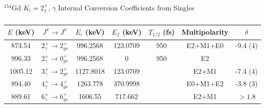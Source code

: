 \begin{table}
    \centering
    \caption{$^{154}$Gd $K_i=2^+_1$, $\gamma$ Internal Conversion Coefficients from Singles}
    \label{tab:154Gd_Single_gamma_Disc}
\begin{ThreePartTable}
    \begin{subtable}{\textwidth}
        \caption{}
    \begin{tabular}{c|c|c|c|c|c|c}
        \toprule
        $E$ (keV)	&	$J^{\pi}	\rightarrow	J^{\pi}$	&	$E_i$ (keV)	&	$E_f$ (keV)	&	$T_{1/2}$ (fs)	&	Multipolarity	&	$\delta$\\
        \hline
        873.54	&	$2^+_{\gamma}	\rightarrow	2^+_{gs}$	&	996.2568	&	123.0709	&	950	&	E2+M1+E0	&	-9.4 (4)	\\
        \hline
        996.33	&	$2^+_{\gamma}	\rightarrow	0^+_{gs}$	&	996.2568	&	0	&	950	&	E2	&	\\
        \hline
        1005.12	&	$3^+_{\gamma}	\rightarrow	2^+_{gs}$	&	1127.8018	&	123.0709	&		&	E2+M1	&	-7.4 (4) \\
        \hline
        894.40	&	$4^+_{\gamma}	\rightarrow	4^+_{gs}$	&	1263.778	&	370.9998	&		&	E0+M1+E2	&	-3.8 (3)	\\
        \hline
        889.61	&	$6^+_{\gamma}	\rightarrow	6^+_{gs}$	&	1606.55	&	717.662	&		&	E2+M1	&	$>1.8$	\\
        \bottomrule
    \end{tabular}
    \end{subtable}
    \end{ThreePartTable}
\end{table}
